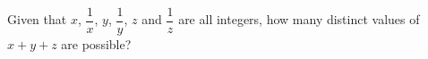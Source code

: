 Given that $x$, $\dfrac1x$, $y$, $\dfrac1y$, $z$ and $\dfrac1z$ are all integers, how many distinct values of $x+y+z$ are possible?
